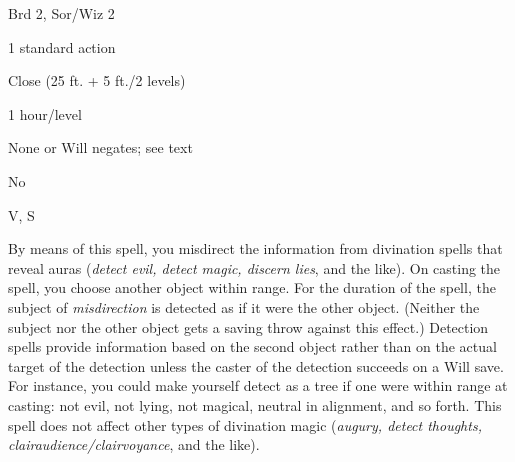 
\begin{description*}
\item[Level:] Brd 2, Sor/Wiz 2
\item[Casting Time:] 1 standard action
\item[Range:] Close (25 ft. + 5 ft./2 levels)
\item[Duration:] 1 hour/level
\item[Saving Throw:] None or Will negates; see text
\item[Spell Resistance:] No
\item[Components:] V, S
\end{description*}

By means of this spell, you misdirect the information from divination spells that
reveal auras (\textit{detect evil, detect magic, discern lies}, and the like).
On casting the spell, you choose another object within range. For the duration
of the spell, the subject of \textit{misdirection} is detected as if it were the
other object. (Neither the subject nor the other object gets a saving throw against
this effect.) Detection spells provide information based on the second object rather
than on the actual target of the detection unless the caster of the detection succeeds
on a Will save. For instance, you could make yourself detect as a tree if one were
within range at casting: not evil, not lying, not magical, neutral in alignment,
and so forth. This spell does not affect other types of divination magic (\textit{augury,
detect thoughts, clairaudience/clairvoyance}, and the like).
